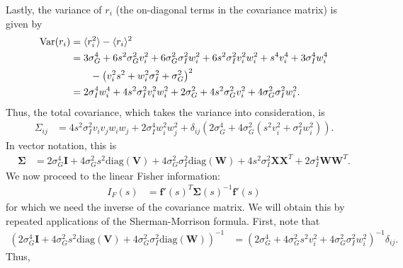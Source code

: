 \documentclass[11pt]{article}
\begin{document}
	Lastly, the variance of $r_i$ (the on-diagonal terms in the covariance matrix) is given by 
	\begin{align}
	\text{Var}(r_i) &= \langle r_i^2 \rangle - \langle r_i\rangle^2 \\
	&= 3\sigma_G^4 + 6s^2\sigma_G^2  v_i^2  +6 \sigma_G^2 \sigma_I^2  w_i^2+  6s^2 \sigma_I^2 v_i^2 w_i^2+ s^4 v_i^4 + 3\sigma_I^4 w_i^4 \notag \\ 
	& \qquad -\left(v_i^2 s^2 + w_i^2 \sigma_I^2 + \sigma_G^2\right)^2 \\
	&= 2\sigma_I^4 w_i^4 + 4s^2 \sigma_I^2 v_i^2 w_i^2 + 2\sigma_G^2 + 4s^2 \sigma_G^2 v_i^2  + 4\sigma_G^2\sigma_I^2 w_i^2.
	\end{align}
	Thus, the total covariance, which takes the variance into consideration, is 
	\begin{align}
	\Sigma_{ij} &= 4 s^2 \sigma_I^2 v_i v_j w_i w_j + 2 \sigma_I^4 w_i^2 w_j^2 + \delta_{ij} \left(2 \sigma_G^4 + 4\sigma_G^2 (s^2 v_i^2 + \sigma_I^2 w_i^2)\right).
	\end{align}
	In vector notation, this is 
	\begin{align}
	\boldsymbol{\Sigma} &= 2\sigma_G^4 \mathbf{I} +4\sigma_G^2 s^2 \text{diag}(\mathbf{V}) + 4\sigma_G^2 \sigma_I^2 \text{diag}(\mathbf{W}) + 4s^2 \sigma_I^2 \mathbf{X}\mathbf{X}^T + 2 \sigma_I^4 \mathbf{W}\mathbf{W}^T.
	\end{align}
	We now proceed to the linear Fisher information:
	\begin{align}
	I_F(s) &= \mathbf{f}'(s)^T \boldsymbol{\Sigma}(s)^{-1} \mathbf{f}'(s)
	\end{align}
	for which we need the inverse of the covariance matrix. We will obtain this by repeated applications of the Sherman-Morrison formula. First, note that 
	\begin{align}
	\left(2\sigma_G^4 \mathbf{I} +4\sigma_G^2 s^2 \text{diag}(\mathbf{V}) + 4\sigma_G^2 \sigma_I^2 \text{diag}(\mathbf{W})\right)^{-1} &= \left(2\sigma_G^4 + 4\sigma_G^2 s^2 v_i^2 + 4\sigma_G^2 \sigma_I^2 w_i^2\right)^{-1}\delta_{ij}.
	\end{align}
	Thus,
\end{document}
